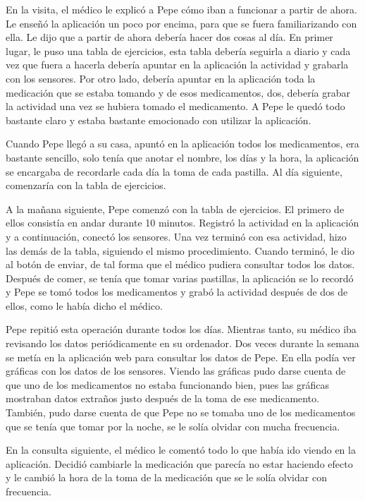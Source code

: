 \documentclass[11pt,spanish]{article}
\begin{document}
En la visita, el médico le explicó a Pepe cómo iban a funcionar a partir de ahora. Le enseñó la aplicación un poco por encima, para que se fuera familiarizando con ella. Le dijo que a partir de ahora debería hacer dos cosas al día. En primer lugar, le puso una tabla de ejercicios, esta tabla debería seguirla a diario y cada vez que fuera a hacerla debería apuntar en la aplicación la actividad y grabarla con los sensores. Por otro lado, debería apuntar en la aplicación toda la medicación que se estaba tomando y de esos medicamentos, dos, debería grabar la actividad una vez se hubiera tomado el medicamento. A Pepe le quedó todo bastante claro y estaba bastante emocionado con utilizar la aplicación.
\newline

Cuando Pepe llegó a su casa, apuntó en la aplicación todos los medicamentos, era bastante sencillo, solo tenía que anotar el nombre, los días y la hora, la aplicación se encargaba de recordarle cada día la toma de cada pastilla. Al día siguiente, comenzaría con la tabla de ejercicios.
\newline

A la mañana siguiente, Pepe comenzó con la tabla de ejercicios. El primero de ellos consistía en andar durante 10 minutos. Registró la actividad en la aplicación y a continuación, conectó los sensores. Una vez terminó con esa actividad, hizo las demás de la tabla, siguiendo el mismo procedimiento. Cuando terminó, le dio al botón de enviar, de tal forma que el médico pudiera consultar todos los datos. Después de comer, se tenía que tomar varias pastillas, la aplicación se lo recordó y Pepe se tomó todos los medicamentos y grabó la actividad después de dos de ellos, como le había dicho el médico.
\newline

Pepe repitió esta operación durante todos los días. Mientras tanto, su médico iba revisando los datos periódicamente en su ordenador. Dos veces durante la semana se metía en la aplicación web para consultar los datos de Pepe. En ella podía ver gráficas con los datos de los sensores. Viendo las gráficas pudo darse cuenta de que uno de los medicamentos no estaba funcionando bien, pues las gráficas mostraban datos extraños justo después de la toma de ese medicamento. También, pudo darse cuenta de que Pepe no se tomaba uno de los medicamentos que se tenía que tomar por la noche, se le solía olvidar con mucha frecuencia.
\newline

En la consulta siguiente, el médico le comentó todo lo que había ido viendo en la aplicación. Decidió cambiarle la medicación que parecía no estar haciendo efecto y le cambió la hora de la toma de la medicación que se le solía olvidar con frecuencia.
\newpage
\end{document}
